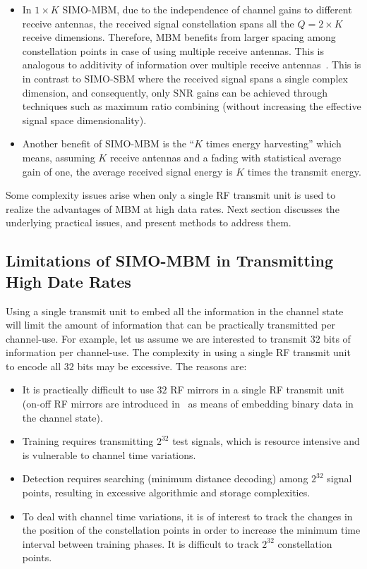 \begin{itemize}
\item In $1 \times K$ SIMO-MBM, due to the independence of channel gains to different receive antennas, the received signal constellation spans all the $Q = 2 \times K$ receive dimensions. Therefore, MBM benefits from larger spacing among constellation points in case of using multiple receive antennas. This is analogous to additivity of information over multiple receive antennas~\cite{c0}. This is in contrast to SIMO-SBM where the received signal spans a single complex dimension, and consequently, only SNR gains can be achieved through techniques such as maximum ratio combining (without increasing the effective signal space dimensionality).
\item Another benefit of SIMO-MBM is the ``$K$ times energy harvesting'' which means, assuming $K$ receive antennas and a fading with statistical average gain of one, the average received signal energy is $ K$ times the transmit energy.

\end{itemize}

Some complexity issues arise when only a single RF transmit unit is used to realize the advantages of MBM at high data rates. Next section discusses the underlying practical issues, and present methods to address them.

\subsection{Limitations of SIMO-MBM in Transmitting High Date Rates}

Using a single transmit unit to embed all the information in the channel state will limit the amount of information that can be practically transmitted per channel-use. For example, let us assume we are interested to transmit $32$ bits of information per channel-use. The complexity in using a single RF transmit unit to encode all $32$ bits may be excessive. The reasons are:

\begin{itemize}
\item It is practically difficult to use $32$ RF mirrors in a single RF transmit unit (on-off RF mirrors are introduced in~\cite{isit2014} as means of embedding binary data in the channel state).

\item Training requires transmitting $2 ^ {32}$ test signals, which is resource intensive and is vulnerable to channel time variations.

\item Detection requires searching (minimum distance decoding) among $2 ^ {32}$ signal points, resulting in excessive algorithmic and storage complexities.

\item To deal with channel time variations, it is of interest to track the changes in the position of the constellation points in order to increase the minimum time interval between training phases. It is difficult to track $2 ^ {32}$ constellation points.

\end{itemize}


